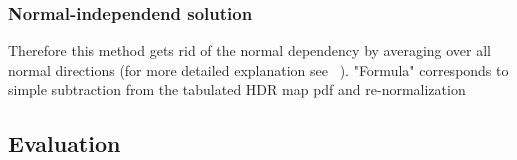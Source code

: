 \subsubsection{Normal-independend solution}
\label{sec:ibl_normal_independend}
Therefore this method gets rid of the normal dependency by averaging over all normal directions (for more detailed explanation see ~\cite[Appendix~D]{Karlik2019}).
"Formula"
corresponds to simple subtraction from the tabulated HDR map pdf and re-normalization



\subsection{Evaluation}
\label{sec:ibl_evalutiona}




